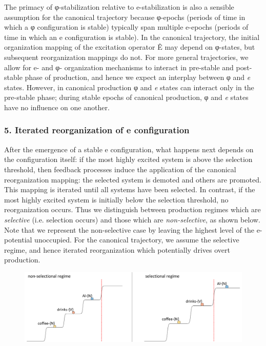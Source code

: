   The primacy of φ-stabilization relative to e-stabilization is also a sensible assumption for the canonical trajectory because φ-epochs (periods of time in which a φ configuration is stable) typically span multiple e-epochs (periods of time in which an e configuration is stable). In the canonical trajectory, the initial organization mapping of the excitation operator Ê may depend on φ-states, but subsequent reorganization mappings do not. For more general trajectories, we allow for e- and φ- organization mechanisms to interact in pre-stable and post-stable phase of production, and hence we expect an interplay between φ and \textit{e} states. However, in canonical production φ and \textit{e} states can interact only in the pre-stable phase; during stable epochs of canonical production, φ and \textit{e} states have no influence on one another. 

\subsubsection{5. Iterated reorganization of e configuration}

After the emergence of a stable e configuration, what happens next depends on the configuration itself: if the most highly excited system is above the selection threshold, then feedback processes induce the application of the canonical reorganization mapping: the selected system is demoted and others are promoted. This mapping is iterated until all systems have been selected. In contrast, if the most highly excited system is initially below the selection threshold, no reorganization occurs. Thus we distinguish between production regimes which are \textit{selective} (i.e. selection occurs) and those which are \textit{non-selective}, as shown below. Note that we represent the non-selective case by leaving the highest level of the e-potential unoccupied. For the canonical trajectory, we assume the selective regime, and hence iterated reorganization which potentially drives overt production. 

  
\begin{figure}
\includegraphics[width=\textwidth]{figures/Tilsen-img53.png}
\caption{\missingcaption}
\label{fig:}
\end{figure}
 

